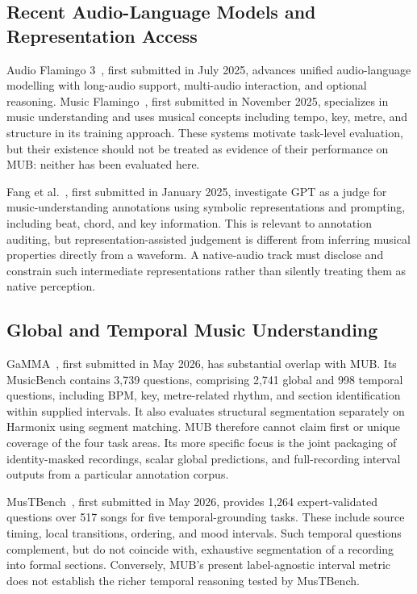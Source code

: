 \documentclass[11pt,a4paper]{article}
\begin{document}
\subsection{Recent Audio-Language Models and Representation Access}
Audio Flamingo 3~\cite{af3}, first submitted in July 2025, advances unified audio-language modelling with long-audio support, multi-audio interaction, and optional reasoning. Music Flamingo~\cite{music-flamingo}, first submitted in November 2025, specializes in music understanding and uses musical concepts including tempo, key, metre, and structure in its training approach. These systems motivate task-level evaluation, but their existence should not be treated as evidence of their performance on MUB: neither has been evaluated here.

Fang et al.~\cite{gpt-judge}, first submitted in January 2025, investigate GPT as a judge for music-understanding annotations using symbolic representations and prompting, including beat, chord, and key information. This is relevant to annotation auditing, but representation-assisted judgement is different from inferring musical properties directly from a waveform. A native-audio track must disclose and constrain such intermediate representations rather than silently treating them as native perception.

\subsection{Global and Temporal Music Understanding}
GaMMA~\cite{gamma}, first submitted in May 2026, has substantial overlap with MUB. Its MusicBench contains 3,739 questions, comprising 2,741 global and 998 temporal questions, including BPM, key, metre-related rhythm, and section identification within supplied intervals. It also evaluates structural segmentation separately on Harmonix using segment matching. MUB therefore cannot claim first or unique coverage of the four task areas. Its more specific focus is the joint packaging of identity-masked recordings, scalar global predictions, and full-recording interval outputs from a particular annotation corpus.

MusTBench~\cite{mustbench}, first submitted in May 2026, provides 1,264 expert-validated questions over 517 songs for five temporal-grounding tasks. These include source timing, local transitions, ordering, and mood intervals. Such temporal questions complement, but do not coincide with, exhaustive segmentation of a recording into formal sections. Conversely, MUB's present label-agnostic interval metric does not establish the richer temporal reasoning tested by MusTBench.
\end{document}
